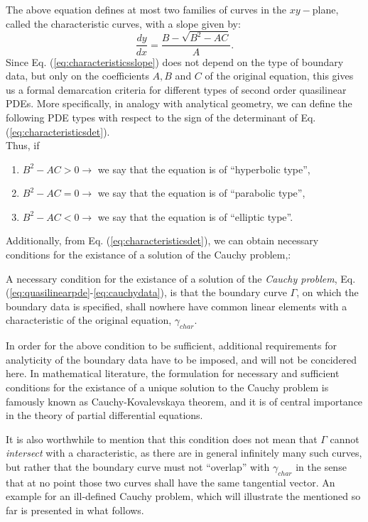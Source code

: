 The above equation defines at most two families of curves in the $xy-$plane, called the characteristic curves, with a slope given by:
\begin{equation}
  \label{eq:characteristicsslope}
  \frac{dy}{dx} = \frac{B-\sqrt{B^2-AC}}{A}.
\end{equation}
Since Eq. (\ref{eq:characteristicsslope}) does not depend on the type of boundary data, but only on the coefficients $A,B $ and $C$ of the original equation, this gives us a formal demarcation criteria for  different types of second order quasilinear PDEs. More specifically, in analogy with analytical geometry, we can define the following PDE types with respect to the sign of the determinant of Eq. (\ref{eq:characteristicsdet}).\\
Thus, if
\begin{enumerate}
  \item{$B^2-AC>0 \rightarrow$  we say that the equation is of ``hyperbolic type'',}
  \item{$B^2-AC=0 \rightarrow$  we say that the equation is of ``parabolic type'',}
  \item{$B^2-AC<0 \rightarrow$  we say that the equation is of ``elliptic type''.}
\end{enumerate}

Additionally, from Eq. (\ref{eq:characteristicsdet}), we can obtain necessary conditions for the existance of a solution of the Cauchy problem,: 
\begin{displayquote}
  A necessary condition for the existance of a solution of the \emph{Cauchy problem}, Eq. (\ref{eq:quasilinearpde}-\ref{eq:cauchydata}), is that the boundary curve $\Gamma$, on which the boundary data is specified, shall nowhere have common linear elements with a characteristic of the original equation, $\gamma_{char}$.
\end{displayquote} 
In order for the above condition to be sufficient, additional requirements for analyticity of the boundary data have to be imposed, and will not be concidered here. In mathematical literature, the formulation for necessary and sufficient conditions for the existance of a unique solution to the Cauchy problem is famously known as Cauchy-Kovalevskaya theorem, and it is of central importance in the theory of partial differential equations. 

It is also worthwhile to mention that this condition does not mean that $\Gamma$ cannot \emph{intersect} with a characteristic, as there are in general infinitely many such curves, but rather that the boundary curve must not ``overlap'' with $\gamma_{char}$ in the sense that at no point those two curves shall have the same tangential vector. An example for an ill-defined Cauchy problem, which will illustrate the mentioned so far is presented in what follows. 

